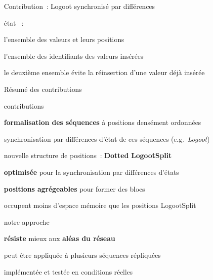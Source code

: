\begin{frame}{Contribution~: Logoot synchronisé par différences}
\begin{minipage}[c][.6\textheight][t]{\textwidth}
    \end{minipage}
    \begin{minipage}[t]{\textwidth}
        \begin{compactitemize}
            \item état ~:
            \begin{compactitemize}
                \item l'ensemble des valeurs et leurs positions
                \item l'ensemble des identifiants des valeurs insérées
            \end{compactitemize}
            \item le deuxième ensemble évite la réinsertion d'une valeur déjà insérée
        \end{compactitemize}
    \end{minipage}
\end{frame}


\begin{frame}{Résumé des contributions}
    \begin{compactitemize}
        \item contributions
        \begin{compactitemize}
            \item \textbf{formalisation des séquences} à positions densément ordonnées
            \item synchronisation par différences d'état de ces séquences (e.g.\ \emph{Logoot})
            \item nouvelle structure de positions~: \textbf{Dotted LogootSplit}
            \begin{compactitemize}
                \item \textbf{optimisée} pour la synchronisation par différences d'états
                \item \textbf{positions agrégeables} pour former des blocs
                \item occupent moins d'espace mémoire que les positions LogootSplit
            \end{compactitemize}
        \end{compactitemize}
        \item notre approche
        \begin{compactitemize}
            \item \textbf{résiste} mieux aux \textbf{aléas du réseau}
            \item peut être appliquée à plusieurs séquences répliquées
            \item implémentée et testée en conditions réelles
        \end{compactitemize}
    \end{compactitemize}
\end{frame}

